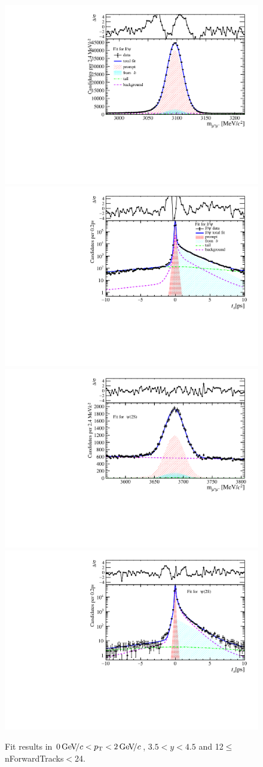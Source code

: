 \begin{figure}[H]
\begin{center}
\includegraphics[width=0.47\linewidth]{pdf/Jpsi/drawmassF/n2y3pt1.pdf}
\includegraphics[width=0.47\linewidth]{pdf/Jpsi/2DFitF/n2y3pt1.pdf}
\vspace*{-0.5cm}
\includegraphics[width=0.47\linewidth]{pdf/Psi2S/drawmassF/n2y3pt1.pdf}
\includegraphics[width=0.47\linewidth]{pdf/Psi2S/2DFitF/n2y3pt1.pdf}
\vspace*{-0.5cm}
\end{center}
\caption{Fit results in $0\text{\,Ge\kern -0.1em V\!/}c<p_{\mathrm{T}}<2\text{\,Ge\kern -0.1em V\!/}c$, $3.5<y<4.5$ and 12$\leq$nForwardTracks$<$24.}
\label{Fitn2y3pt1}
\end{figure}

